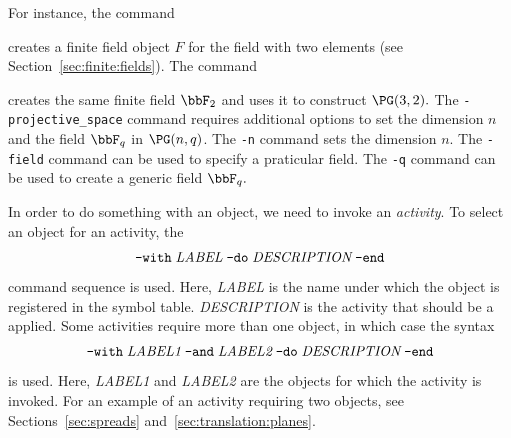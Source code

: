 For instance, the command 
{\tt

}
creates a finite field object $F$ for the field with two elements (see Section~\ref{sec:finite:fields}).
The command
{\tt

}
creates the same finite field $\bbF_2$ and uses it to construct $\PG(3,2).$
The \verb'-projective_space' command requires additional options to 
set the dimension $n$ and the field $\bbF_q$ in $\PG(n,q)$.
The \verb'-n' command sets the dimension $n$. The \verb'-field' command can be used to specify a
praticular field. The \verb'-q' command can be used to create a generic field $\bbF_q.$

\bigskip

In order to do something with an object, we need to invoke an {\em activity}.
To select an object for an activity, the 
$$
\verb'-with' \; \mbox{\em LABEL} \; \verb'-do' \; \mbox{\em DESCRIPTION} \; \verb'-end'
$$
command sequence is used. 
Here, {\em LABEL} is the name under which the object is registered in the symbol table.
{\em DESCRIPTION} is the activity that should be a applied.
Some activities require more than one object, in which case the syntax
$$
\verb'-with' \; \mbox{\em LABEL1} \; \verb'-and' \; \mbox{\em LABEL2} \; \verb'-do' \; \mbox{\em DESCRIPTION} \; \verb'-end'
$$
is used.  Here, {\em LABEL1} and  {\em LABEL2} 
are the objects for which the activity is invoked. 
For an example of an activity requiring two objects, 
see Sections~\ref{sec:spreads} and~\ref{sec:translation:planes}.

\bigskip

